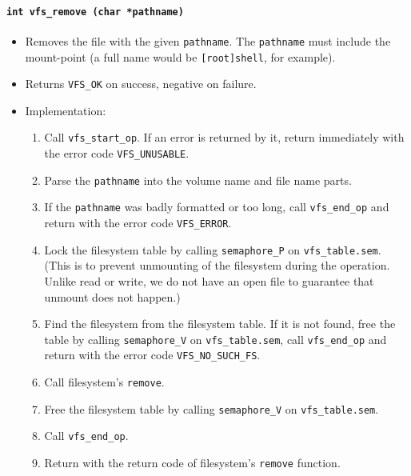 \documentclass[twoside,a4paper]{report}
\makeatletter
\newenvironment{function}[3]{%
\paragraph{\texttt{#1 {\textbf{#2}} (#3)}}%
\index{#2@\texttt{#2}}%
\begin{itemize}%
}{%
\end{itemize}%
}
\makeatother
\begin{document}
\begin{function}{int}{vfs\_remove}{char *pathname}

\item Removes the file with the given \texttt{pathname}. The
\texttt{pathname} must include the mount-point (a full name would be
\texttt{[root]shell}, for example).

\item Returns \texttt{VFS\_OK} on success, negative on failure.

\item Implementation:
\begin{enumerate}

\item Call \texttt{vfs\_start\_op}. If an error is returned by it,
 return immediately with the error code \texttt{VFS\_UNUSABLE}.

\item Parse the \texttt{pathname} into the volume name and file name parts.

\item If the \texttt{pathname} was badly formatted or too long, call
\texttt{vfs\_end\_op} and return with the error code \texttt{VFS\_ERROR}.

\item Lock the filesystem table by calling \texttt{semaphore\_P} on
\texttt{vfs\_table.sem}. (This is to prevent unmounting of the
filesystem during the operation. Unlike read or write, we do not have
an open file to guarantee that unmount does not happen.)

\item Find the filesystem from the filesystem table. If it is not
found, free the table by calling \texttt{semaphore\_V} on
\texttt{vfs\_table.sem}, call \texttt{vfs\_end\_op} and return with
the error code \texttt{VFS\_NO\_SUCH\_FS}.

\item Call filesystem's \texttt{remove}.

\item Free the filesystem table by calling \texttt{semaphore\_V} on
\texttt{vfs\_table.sem}.

\item Call \texttt{vfs\_end\_op}.

\item Return with the return code of filesystem's \texttt{remove}
function.

\end{enumerate}
\end{function}
\end{document}
